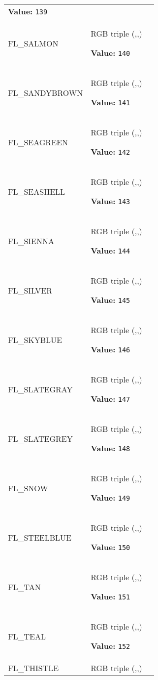 \begin{longtable}{|p{\varnamewidth}|p{\vardescrwidth}|l}
\textbf{Value:} 
{\tt 139}&\\
\cline{1-2}
\raggedright F\-L\-\_\-S\-A\-L\-M\-O\-N\- & \raggedright RGB triple (,,)

\textbf{Value:} 
{\tt 140}&\\
\cline{1-2}
\raggedright F\-L\-\_\-S\-A\-N\-D\-Y\-B\-R\-O\-W\-N\- & \raggedright RGB triple (,,)

\textbf{Value:} 
{\tt 141}&\\
\cline{1-2}
\raggedright F\-L\-\_\-S\-E\-A\-G\-R\-E\-E\-N\- & \raggedright RGB triple (,,)

\textbf{Value:} 
{\tt 142}&\\
\cline{1-2}
\raggedright F\-L\-\_\-S\-E\-A\-S\-H\-E\-L\-L\- & \raggedright RGB triple (,,)

\textbf{Value:} 
{\tt 143}&\\
\cline{1-2}
\raggedright F\-L\-\_\-S\-I\-E\-N\-N\-A\- & \raggedright RGB triple (,,)

\textbf{Value:} 
{\tt 144}&\\
\cline{1-2}
\raggedright F\-L\-\_\-S\-I\-L\-V\-E\-R\- & \raggedright RGB triple (,,)

\textbf{Value:} 
{\tt 145}&\\
\cline{1-2}
\raggedright F\-L\-\_\-S\-K\-Y\-B\-L\-U\-E\- & \raggedright RGB triple (,,)

\textbf{Value:} 
{\tt 146}&\\
\cline{1-2}
\raggedright F\-L\-\_\-S\-L\-A\-T\-E\-G\-R\-A\-Y\- & \raggedright RGB triple (,,)

\textbf{Value:} 
{\tt 147}&\\
\cline{1-2}
\raggedright F\-L\-\_\-S\-L\-A\-T\-E\-G\-R\-E\-Y\- & \raggedright RGB triple (,,)

\textbf{Value:} 
{\tt 148}&\\
\cline{1-2}
\raggedright F\-L\-\_\-S\-N\-O\-W\- & \raggedright RGB triple (,,)

\textbf{Value:} 
{\tt 149}&\\
\cline{1-2}
\raggedright F\-L\-\_\-S\-T\-E\-E\-L\-B\-L\-U\-E\- & \raggedright RGB triple (,,)

\textbf{Value:} 
{\tt 150}&\\
\cline{1-2}
\raggedright F\-L\-\_\-T\-A\-N\- & \raggedright RGB triple (,,)

\textbf{Value:} 
{\tt 151}&\\
\cline{1-2}
\raggedright F\-L\-\_\-T\-E\-A\-L\- & \raggedright RGB triple (,,)

\textbf{Value:} 
{\tt 152}&\\
\cline{1-2}
\raggedright F\-L\-\_\-T\-H\-I\-S\-T\-L\-E\- & \raggedright RGB triple (,,)


\end{longtable}
